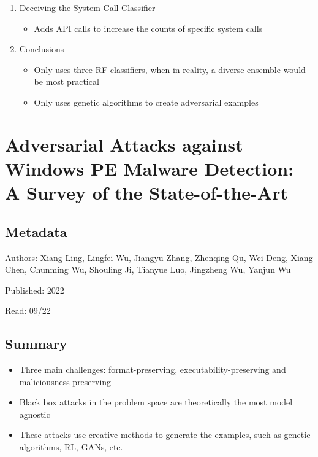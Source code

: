 \documentclass{article}
\begin{document}
\begin{enumerate}
\begin{itemize}
	\end{itemize}
	\item Deceiving the System Call Classifier
	\begin{itemize}
		\item Adds API calls to increase the counts of specific system calls
	\end{itemize}
	\item Conclusions
	\begin{itemize}
		\item Only uses three RF classifiers, when in reality, a diverse ensemble would be most practical
		\item Only uses genetic algorithms to create adversarial examples
	\end{itemize}
\end{enumerate}
\pagebreak


\section*{Adversarial Attacks against Windows PE Malware Detection: A Survey of the State-of-the-Art}

\subsection*{Metadata}

\noindent Authors: Xiang Ling, Lingfei Wu, Jiangyu Zhang, Zhenqing Qu, Wei Deng, Xiang Chen, Chunming Wu, Shouling Ji, Tianyue Luo, Jingzheng Wu, Yanjun Wu

\noindent Published: 2022

\noindent Read: 09/22

\subsection*{Summary}
\begin{itemize}
	\item Three main challenges: format-preserving, executability-preserving and maliciousness-preserving
	\item Black box attacks in the problem space are theoretically the most model agnostic
	\item These attacks use creative methods to generate the examples, such as genetic algorithms, RL, GANs, etc.
\end{itemize}
\end{document}
